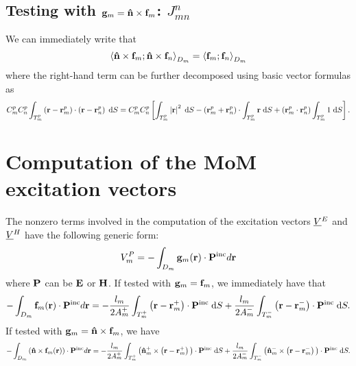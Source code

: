 \subsection{Testing with $\mathbf{g}_m = \mathbf{\Hat{n}} \times \mathbf{f}_m$: $J_{mn}^n$}
%
\par
We can immediately write that
\begin{equation}
\left\langle \mathbf{\Hat{n}} \times \mathbf{f}_m ; \mathbf{\Hat{n}} \times \mathbf{f}_n \right\rangle_{D_m} = \left\langle \mathbf{f}_m ; \mathbf{f}_n \right\rangle_{D_m} 
\end{equation}
where the right-hand term can be further decomposed using basic vector formulas as
\begin{equation} \label{eqn:MMPIE_J_n_x_RWG_testing_diag_term}
C_m^p C_n^p \int_{T_m^p} \left(\mathbf{r}-\mathbf{r}_m^p \right) \cdot \left(\mathbf{r}-\mathbf{r}_n^p\right) \; \text{d} S = C_m^p C_n^p \left[ \int_{T_m^p} \left|\mathbf{r}\right|^2 \; \text{d} S - \left(\mathbf{r}_m^p + \mathbf{r}_n^p \right) \cdot \int_{T_m^p} \mathbf{r} \; \text{d} S + \left(\mathbf{r}_m^p \cdot \mathbf{r}_n^p \right) \int_{T_m^p} 1 \; \text{d} S\right].
\end{equation}


\section{Computation of the MoM excitation vectors}
\label{app:Computation of the MoM excitation vectors}
%
\par
The nonzero terms involved in the computation of the excitation vectors $\underline{V} \thinspace \negthinspace _{} ^{E}$ and $\underline{V} \thinspace \negthinspace _{} ^{H}$ have the following generic form:
\begin{equation}
V_m^{P} = -\int_{D_m}\mathbf{g}_m \!\left(\mathbf{r}\right) \cdot \mathbf{P}^\text{inc} d\mathbf{r}
\end{equation}
where $\mathbf{P}$ can be $\mathbf{E}$ or $\mathbf{H}$. If tested with $\mathbf{g}_m = \mathbf{f}_m$, we immediately have that
\begin{equation}
-\int_{D_m}\mathbf{f}_m \!\left(\mathbf{r}\right) \cdot \mathbf{P}^\text{inc} d\mathbf{r} = -\frac{l_m}{2 A_m^+}\int_{T_m^+} \left(\mathbf{r} - \mathbf{r}_m^+ \right) \cdot \mathbf{P}^\text{inc} \; \text{d} S + \frac{l_m}{2 A_m^-}\int_{T_m^-} \left(\mathbf{r} - \mathbf{r}_m^- \right) \cdot \mathbf{P}^\text{inc} \; \text{d} S.
\end{equation}
If tested with $\mathbf{g}_m = \mathbf{\Hat{n}} \times \mathbf{f}_m$, we have 
\begin{equation}
-\int_{D_m} \left(\mathbf{\Hat{n}}\times\mathbf{f}_m\!\left(\mathbf{r}\right)\right)  \cdot \mathbf{P}^\text{inc} d\mathbf{r} = -\frac{l_m}{2 A_m^+}\int_{T_m^+} \big( \mathbf{\Hat{n}}_m^+ \times \left(\mathbf{r} - \mathbf{r}_m^+ \right) \big) \cdot \mathbf{P}^\text{inc} \; \text{d} S + \frac{l_m}{2 A_m^-}\int_{T_m^-} \big( \mathbf{\Hat{n}}_m^- \times \left(\mathbf{r} - \mathbf{r}_m^- \right)\big) \cdot \mathbf{P}^\text{inc} \; \text{d} S.
\end{equation}


